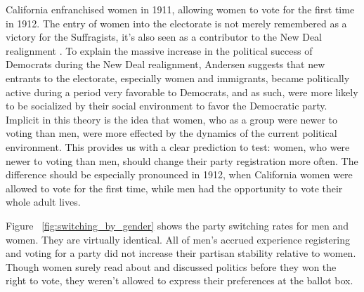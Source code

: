 \documentclass[11pt]{scrartcl}\usepackage[]{graphicx}\usepackage[]{color}
\makeatletter
\newenvironment{kframe}{%
 \def\at@end@of@kframe{}%
 \ifinner\ifhmode%
  \def\at@end@of@kframe{\end{minipage}}%
  \begin{minipage}{\columnwidth}%
 \fi\fi%
 \def\FrameCommand##1{\hskip\@totalleftmargin \hskip-\fboxsep
 \colorbox{shadecolor}{##1}\hskip-\fboxsep
     \hskip-\linewidth \hskip-\@totalleftmargin \hskip\columnwidth}%
 \MakeFramed {\advance\hsize-\width
   \@totalleftmargin\z@ \linewidth\hsize
   \@setminipage}}%
 {\par\unskip\endMakeFramed%
 \at@end@of@kframe}
\newenvironment{knitrout}{}{} %
\makeatother
\begin{document}
California enfranchised women in 1911, allowing women to vote for the first time in 1912. The entry of women into the electorate is not merely remembered as a victory for the Suffragists, it's also seen as a contributor to the New Deal realignment \citep{corder2016counting, andersen1979creation}. To explain the massive increase in the political success of Democrats during the New Deal realignment, Andersen suggests that new entrants to the electorate, especially women and immigrants, became politically active during a period very favorable to Democrats, and as such, were more likely to be socialized by their social environment to favor the Democratic party. Implicit in this theory is the idea that women, who as a group were newer to voting than men, were more effected by the dynamics of the current political environment. This provides us with a clear prediction to test: women, who were newer to voting than men, should change their party registration more often. The difference should be especially pronounced in 1912, when California women were allowed to vote for the first time, while men had the opportunity to vote their whole adult lives.







\begin{knitrout}
\color{fgcolor}\begin{kframe}


{\ttfamily\noindent\bfseries\color{errorcolor}{\#\# Error in readChar(con, 5L, useBytes = TRUE): cannot open the connection}}

{\ttfamily\noindent\bfseries\color{errorcolor}{\#\# Error in stri\_length(string): object 'plot.df.panelchange.by.sex' not found}}

{\ttfamily\noindent\bfseries{}}

{\ttfamily\noindent\bfseries\color{errorcolor}{\#\# Error in eval(expr, envir, enclos): object 'plot.df.panelchange.by.sex' not found}}

{\ttfamily\noindent\bfseries\color{errorcolor}{\#\# Error in eval(expr, envir, enclos): object 'plot.df.panelchange.by.sex' not found}}\end{kframe}
\end{knitrout}

Figure ~\ref{fig:switching_by_gender} shows the party switching rates for men and women. They are virtually identical. All of men's accrued experience registering and voting for a party did not increase their partisan stability relative to women. Though women surely read about and discussed politics before they won the right to vote, they weren't allowed to express their preferences at the ballot box.
\end{document}
